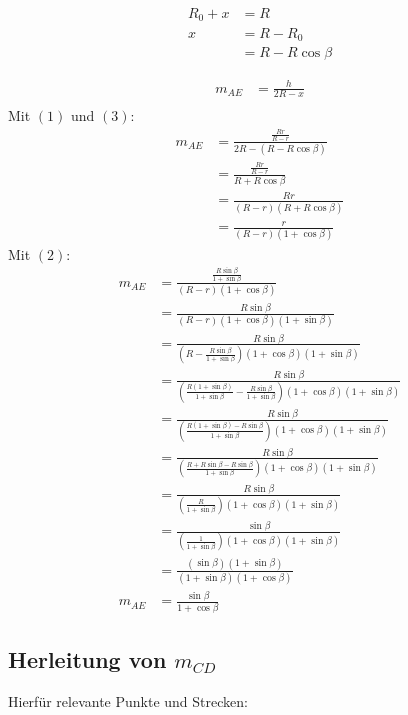 \documentclass[12pt,a4paper,oneside]{article}
\begin{document}
\begin{samepage}
	\begin{align*}
		R_0 + x &= R \\
		x &= R - R_0 \\
		&= R - R \cos\beta \tag{3}
	\end{align*}
\end{samepage} \goodbreak

\begin{samepage}
	\begin{align*}
		m_{AE} &= \frac{h}{2R - x} \\
	\end{align*}
	Mit $(1)$ und $(3)$: \nopagebreak
	\begin{align*}
		m_{AE} &= \frac{\frac{Rr}{R-r}}{2R - (R-R \cos\beta)} \\
		&= \frac{\frac{Rr}{R-r}}{R+R \cos\beta} \\
		&= \frac{Rr}{(R-r)(R+R \cos\beta)} \\
		&= \frac{r}{(R-r)(1+\cos\beta)}
	\end{align*}
	Mit $(2)$: \nopagebreak
	\begin{align*}
		m_{AE} &= \frac{\frac{R \sin\beta}{1+\sin\beta}}{(R-r)(1+\cos\beta)} \\
		&= \frac{R \sin\beta}{(R-r)(1+\cos\beta)(1+\sin\beta)} \\
		&= \frac{R \sin\beta}{(R-\frac{R \sin\beta}{1+\sin\beta})(1+\cos\beta)(1+\sin\beta)} \\
		&= \frac{R \sin\beta}{(\frac{R(1+\sin\beta)}{1+\sin\beta}-\frac{R \sin\beta}{1+\sin\beta})(1+\cos\beta)(1+\sin\beta)} \\
		&= \frac{R \sin\beta}{(\frac{R(1+\sin\beta) - R\sin\beta}{1+\sin\beta})(1+\cos\beta)(1+\sin\beta)} \\
		&= \frac{R \sin\beta}{(\frac{R+R\sin\beta-R\sin\beta}{1+\sin\beta})(1+\cos\beta)(1+\sin\beta)} \\
		&= \frac{R \sin\beta}{(\frac{R}{1+\sin\beta})(1+\cos\beta)(1+\sin\beta)} \\
		&= \frac{\sin\beta}{(\frac{1}{1+\sin\beta})(1+\cos\beta)(1+\sin\beta)} \\
		&= \frac{(\sin\beta)(1+\sin\beta)}{(1+\sin\beta)(1+\cos\beta)} \\
		m_{AE} &= \frac{\sin\beta}{1+\cos\beta}
	\end{align*}
\end{samepage}

\pagebreak

\subsection[]{Herleitung von $m_{CD}$}
Hierfür relevante Punkte und Strecken:
\end{document}
